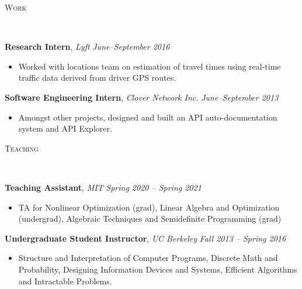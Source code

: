 \documentclass[9pt]{article}
\newenvironment{changemargin}[2]{%
  \begin{list}{}{%
      \setlength{\topsep}{0pt}%
      \setlength{\leftmargin}{#1}%
      \setlength{\rightmargin}{#2}%
      \setlength{\listparindent}{\parindent}%
      \setlength{\itemindent}{\parindent}%
      \setlength{\parsep}{\parskip}%
    }%
  \item[]}{\end{list}
}
\newcommand{\lineover}{
  \begin{changemargin}{-0.05in}{-0.05in}
    \vspace*{-8pt}
    \hrulefill \\
    \vspace*{-2pt}
  \end{changemargin}
}
\newcommand{\header}[1]{
  \begin{changemargin}{-0.5in}{-0.5in}
    \scshape{#1}\\
    \lineover
  \end{changemargin}
}
\newenvironment{body} {
  \vspace*{-16pt}
  \begin{changemargin}{-0.25in}{-0.5in}
  }
  {\end{changemargin}
}
\begin{document}
\header{Work}

\begin{body}
  \vspace{14pt}
  \textbf{Research Intern}, \emph{Lyft} \hfill \emph{June--September 2016}\\
  \vspace*{-5pt}
  \begin{itemize} \itemsep -0pt  %
  \item Worked with locations team on estimation of travel times using real-time
    traffic data derived from driver GPS routes.
  \end{itemize}

  \textbf{Software Engineering Intern}, \emph{Clover Network Inc.} \hfill \emph{June--September 2013}\\
  \vspace*{-5pt}
  \begin{itemize} \itemsep -0pt  %
  \item Amongst other projects, designed and built an API auto-documentation system and API Explorer.
  \end{itemize}
\end{body}
\smallskip

\header{Teaching}
\begin{body}
  \vspace{14pt}
  \textbf{Teaching Assistant}, \emph{MIT} \hfill \emph{Spring 2020 -- Spring 2021}\\
  \vspace*{-5pt}
  \begin{itemize} \itemsep -0pt  %
  \item TA for Nonlinear Optimization (grad), Linear Algebra and Optimization
    (undergrad), Algebraic Techniques and Semidefinite Programming (grad)
  \end{itemize}

  \textbf{Undergraduate Student Instructor}, \emph{UC Berkeley} \hfill \emph{Fall 2013 -- Spring 2016}\\
  \vspace*{-5pt}
  \begin{itemize} \itemsep -0pt  %
  \item Structure and Interpretation of Computer Programs, Discrete Math and
    Probability, Designing Information Devices and Systems, Efficient Algorithms
    and Intractable Problems.
  \end{itemize}
\end{body}
\smallskip
\end{document}
